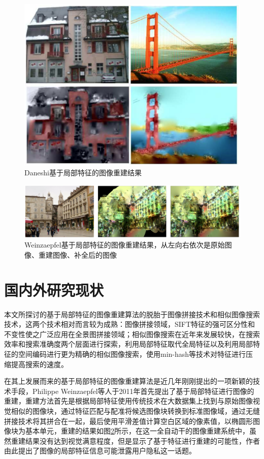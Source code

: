 \begin{figure}
\centering\includegraphics[width=12cm]{imgs/ch1/Daneshi_res}
\caption{Daneshi基于局部特征的图像重建结果}
\label{fig:Daneshi_res}
\end{figure}

\begin{figure}
\centering\includegraphics[width=12cm]{imgs/ch1/Weinzaepfel_res}
\caption{Weinzaepfel基于局部特征的图像重建结果，从左向右依次是原始图像、重建图像、补全后的图像}
\label{fig:Weinzaepfel_res}
\end{figure}



\section{国内外研究现状}

本文所探讨的基于局部特征的图像重建算法的脱胎于图像拼接技术和相似图像搜索技术，这两个技术相对而言较为成熟：图像拼接领域，SIFT特征的强可区分性和不变性使之广泛应用在全景图拼接领域\cite{Brown:2006ir}；相似图像搜索在近年来发展较快，在搜索效率和搜索准确度两个层面进行探索，利用局部特征取代全局特征\cite{Xu:2013wc,POLICY:2013te,Wu:2009bl}以及利用局部特征的空间编码\cite{Zhou:2010tv}进行更为精确的相似图像搜索，使用min-hash等技术对特征进行压缩\cite{Chum:2008jo}提高搜索的速度。

在其上发展而来的基于局部特征的图像重建算法是近几年刚刚提出的一项新颖的技术手段，Philippe Weinzaepfel等人于2011年首先提出了基于局部特征进行图像的重建\cite{Weinzaepfel:2011jh}，重建方法首先是根据局部特征使用传统技术在大数据集上找到与原始图像视觉相似的图像块，通过特征匹配与配准将候选图像块转换到标准图像域，通过无缝拼接技术将其拼合在一起，最后使用平滑差值计算空白区域的像素值，以椭圆形图像块为基本单元，重建的结果如图\ref{fig:Weinzaepfel_res}所示，在这一全自动干的图像重建系统中，虽然重建结果没有达到视觉满意程度，但是显示了基于特征进行重建的可能性，作者由此提出了图像的局部特征信息可能泄露用户隐私这一话题。

